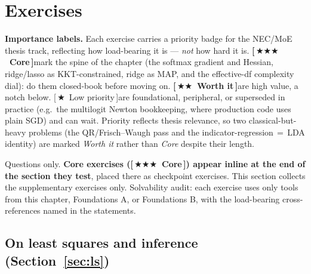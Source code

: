 \documentclass[11pt]{article}
\numberwithin{equation}{section}
\theoremstyle{plain}
\theoremstyle{definition}
\theoremstyle{remark}
\newcounter{exercise}
\newcommand{\prioCore}{{\normalfont\small\textbf{\textcolor{necblue}{[\,\ensuremath{\bigstar\bigstar\bigstar}\ Core\,]}}}\hspace{0.5em}}
\newcommand{\prioWorth}{{\normalfont\small\textbf{\textcolor{finmaroon}{[\,\ensuremath{\bigstar\bigstar}\ Worth it\,]}}}\hspace{0.5em}}
\newcommand{\prioLow}{{\normalfont\small\textcolor{priogray}{[\,\ensuremath{\bigstar}\ Low priority\,]}}\hspace{0.5em}}
\begin{document}
\section{Exercises}\label{sec:exercises}

\noindent\textbf{Importance labels.} Each exercise carries a priority badge for the NEC/MoE thesis track, reflecting how load-bearing it is --- \emph{not} how hard it is. \prioCore mark the spine of the chapter (the softmax gradient and Hessian, ridge/lasso as KKT-constrained, ridge as MAP, and the effective-df complexity dial): do them closed-book before moving on. \prioWorth are high value, a notch below. \prioLow are foundational, peripheral, or superseded in practice (e.g.\ the multilogit Newton bookkeeping, where production code uses plain SGD) and can wait. Priority reflects thesis relevance, so two classical-but-heavy problems (the QR/Frisch--Waugh pass and the indicator-regression$\,=\,$LDA identity) are marked \emph{Worth it} rather than \emph{Core} despite their length.

Questions only. \textbf{Core exercises (\prioCore) appear inline at the end of the section they test}, placed there as checkpoint exercises. This section collects the supplementary exercises only. Solvability audit: each exercise uses only tools from this chapter, Foundations A, or Foundations B, with the load-bearing cross-references named in the statements.

\subsection*{On least squares and inference (Section~\ref{sec:ls})}
\end{document}

